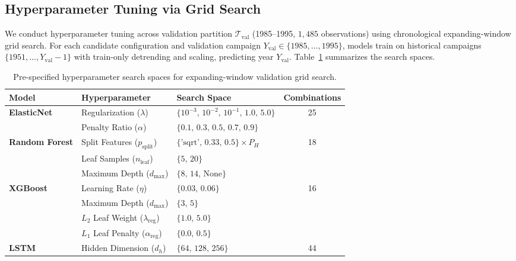 \subsection{Hyperparameter Tuning via Grid Search}
\label{sec:meth_grid_search}

We conduct hyperparameter tuning across validation partition $\mathcal{T}_{\text{val}}$ (1985--1995, $1{,}485$ observations) using chronological expanding-window grid search. For each candidate configuration and validation campaign $Y_{\text{val}} \in \{1985, \dots, 1995\}$, models train on historical campaigns $\{1951, \dots, Y_{\text{val}}-1\}$ with train-only detrending and scaling, predicting year $Y_{\text{val}}$. Table~\ref{tab:hyperparameter_grids} summarizes the search spaces.

\begin{table}[htbp]
\centering
\singlespacing
\footnotesize
\setlength{\tabcolsep}{6pt}
\renewcommand{\arraystretch}{1.1}
\caption{Pre-specified hyperparameter search spaces for expanding-window validation grid search.}
\label{tab:hyperparameter_grids}
\begin{tabularx}{\textwidth}{l p{4.0cm} X c}
\toprule
\textbf{Model} & \textbf{Hyperparameter} & \textbf{Search Space} & \textbf{Combinations} \\
\midrule
\multirow{2}{*}{\textbf{ElasticNet}} & Regularization ($\lambda$) & $\{10^{-3}, \, 10^{-2}, \, 10^{-1}, \, 1.0, \, 5.0\}$ & \multirow{2}{*}{25} \\
 & Penalty Ratio ($\alpha$) & $\{0.1, \, 0.3, \, 0.5, \, 0.7, \, 0.9\}$ & \\
\midrule
\multirow{3}{*}{\textbf{Random Forest}} & Split Features ($p_{\text{split}}$) & $\{\text{'sqrt'}, \, 0.33, \, 0.5\} \times P_H$ & \multirow{3}{*}{18} \\
 & Leaf Samples ($n_{\text{leaf}}$) & $\{5, \, 20\}$ & \\
  & Maximum Depth ($d_{\text{max}}$) & $\{8, \, 14, \, \text{None}\}$ & \\
\midrule
\multirow{4}{*}{\textbf{XGBoost}} & Learning Rate ($\eta$) & $\{0.03, \, 0.06\}$ & \multirow{4}{*}{16} \\
 & Maximum Depth ($d_{\text{max}}$) & $\{3, \, 5\}$ & \\
 & $L_2$ Leaf Weight ($\lambda_{\text{reg}}$) & $\{1.0, \, 5.0\}$ & \\
 & $L_1$ Leaf Penalty ($\alpha_{\text{reg}}$) & $\{0.0, \, 0.5\}$ & \\
\midrule
\multirow{4}{*}{\textbf{LSTM}} & Hidden Dimension ($d_h$) & $\{64, \, 128, \, 256\}$ & \multirow{4}{*}{44} \\

\end{tabularx}
\end{table}
